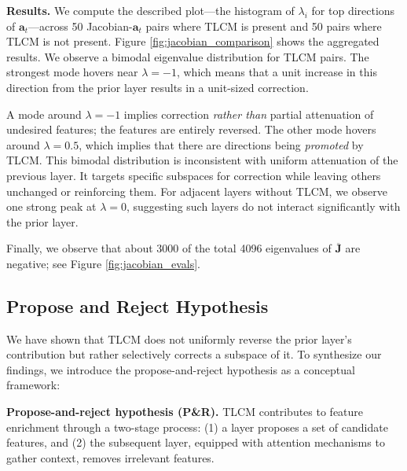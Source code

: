 


\textbf{Results.} We compute the described plot---the histogram of $\lambda_i$ for top directions of $\mathbf{a}_t$---across 50 Jacobian-$\mathbf{a}_t$ pairs where TLCM is present and 50 pairs where TLCM is not present. Figure \ref{fig:jacobian_comparison} shows the aggregated results. We observe a bimodal eigenvalue distribution for TLCM pairs. The strongest mode hovers near $\lambda = -1$, which means that a unit increase in this direction from the prior layer results in a unit-sized correction.

A mode around $\lambda = -1$ implies correction \textit{rather than} partial attenuation of undesired features; the features are entirely reversed. The other mode hovers around $\lambda = 0.5$, which implies that there are directions being \textit{promoted} by TLCM. This bimodal distribution is inconsistent with uniform attenuation of the previous layer. It targets specific subspaces for correction while leaving others unchanged or reinforcing them. For adjacent layers without TLCM, we observe one strong peak at $\lambda = 0$, suggesting such layers do not interact significantly with the prior layer.


Finally, we observe that about 3000 of the total 4096 eigenvalues of $\overline{\mathbf{J}}$ are negative; see Figure \ref{fig:jacobian_evals}.

\subsection{Propose and Reject Hypothesis}

We have shown that TLCM does not uniformly reverse the prior layer's contribution but rather selectively corrects a subspace of it. To synthesize our findings, we introduce the propose-and-reject hypothesis as a conceptual framework:

\textbf{Propose-and-reject hypothesis (P\&R).} TLCM contributes to feature enrichment through a two-stage process: (1) a layer proposes a set of candidate features, and (2) the subsequent layer, equipped with attention mechanisms to gather context, removes irrelevant features.

